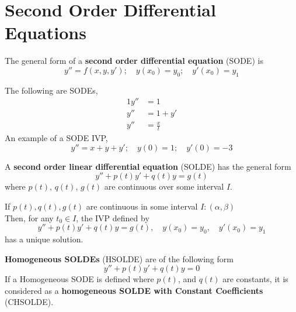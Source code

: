 \documentclass[twoside]{report}
\begin{document}
    \section{Second Order Differential Equations}
    \begin{definition}
        The general form of a \textbf{second order differential equation} (SODE) is
        \begin{equation}
            y'' = f(x, y, y');\quad y(x_{0}) = y_{0};\quad y'(x_{0}) = y_{1}
        \end{equation}
    \end{definition}
    \np
    \begin{example}
        The following are SODEs,
        \begin{alignat}{1}
            y'' &= 1\\
            y'' &= 1 + y'\\
            y'' &= \frac{x}{t}
        \end{alignat}
        An example of a SODE IVP,
        \begin{equation}
            y'' = x + y + y';\quad y(0) = 1;\quad y'(0) = -3
        \end{equation}
    \end{example}
    \begin{definition}
        A \textbf{second order linear differential equation} (SOLDE) has the general form
        \begin{equation}
            y'' + p(t)y' + q(t)y = g(t)
        \end{equation}
        where $p(t)$, $q(t)$, $g(t)$ are continuous over some interval $I$.
    \end{definition}
    \begin{btheorem}
        If $p(t), q(t), g(t)$ are continuous in some interval $I: (\alpha, \beta)$\\
        Then, for any $t_{0} \in I$, the IVP defined by
        \begin{equation}
            y'' + p(t)y' + q(t)y = g(t),\quad y(x_{0}) = y_{0},\quad y'(x_{0}) = y_{1}
        \end{equation}
        has a unique solution.
    \end{btheorem}
    \begin{definition}
        \textbf{Homogeneous SOLDEs} (HSOLDE) are of the following form
        \begin{equation}
            y'' + p(t)y' + q(t)y = 0
        \end{equation}
        If a Homogeneous SODE is defined where $p(t)$, and $q(t)$ are constants, it is considered as a \textbf{homogeneous SOLDE with Constant Coefficients} (CHSOLDE).
    \end{definition}
    \np
\end{document}
